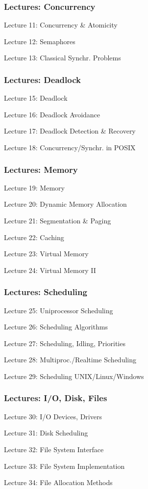 \begin{frame}
\frametitle{Lectures: Concurrency}

{\LARGE
Lecture 11: Concurrency \& Atomicity

Lecture 12: Semaphores

Lecture 13: Classical Synchr. Problems
}

\end{frame}

\begin{frame}
\frametitle{Lectures: Deadlock}

{\LARGE
Lecture 15: Deadlock

Lecture 16: Deadlock Avoidance

Lecture 17: Deadlock Detection \& Recovery

Lecture 18: Concurrency/Synchr. in POSIX
}

\end{frame}

\begin{frame}
\frametitle{Lectures: Memory}

{\LARGE
Lecture 19: Memory

Lecture 20: Dynamic Memory Allocation

Lecture 21: Segmentation \& Paging

Lecture 22: Caching

Lecture 23: Virtual Memory

Lecture 24: Virtual Memory II
}

\end{frame}

\begin{frame}
\frametitle{Lectures: Scheduling}

{\LARGE
Lecture 25: Uniprocessor Scheduling

Lecture 26: Scheduling Algorithms

Lecture 27: Scheduling, Idling, Priorities

Lecture 28: Multiproc./Realtime Scheduling

Lecture 29: Scheduling UNIX/Linux/Windows
}

\end{frame}

\begin{frame}
\frametitle{Lectures: I/O, Disk, Files}

{\LARGE
Lecture 30: I/O Devices, Drivers

Lecture 31: Disk Scheduling

Lecture 32: File System Interface

Lecture 33: File System Implementation

Lecture 34: File Allocation Methods
}

\end{frame}

